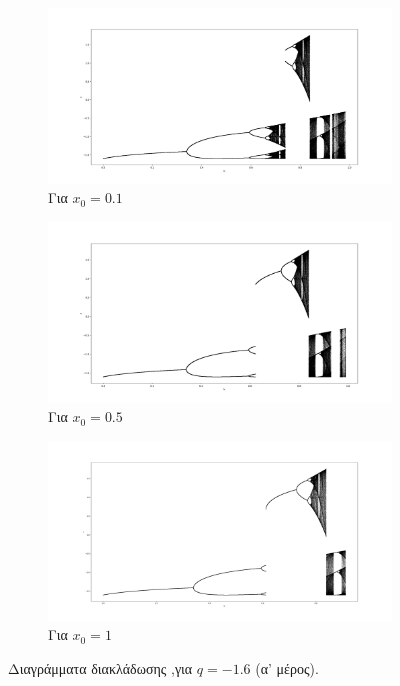 \begin{figure}[ht]
	\centering
	
	\begin{subfigure}[b]{0.8\textwidth}
		\centering
		\includegraphics[width=\textwidth]{LateX images/graphs q16/g1}
		\caption{Για \(x_0=0.1\)}
		\label{f:g27}
	\end{subfigure}
	\hfill
	\begin{subfigure}[b]{0.8\textwidth}
		\centering
		\includegraphics[width=\textwidth]{LateX images/graphs q16/g2}
		\caption{Για \(x_0=0.5\)}
		\label{f:g28}
	\end{subfigure}
	\hfill
	\begin{subfigure}[b]{0.8\textwidth}
		\centering
		\includegraphics[width=\textwidth]{LateX images/graphs q16/g3}
		\caption{Για \(x_0=1\)}
		\label{f:g29}
	\end{subfigure}
	\hfill
	\caption{ Διαγράμματα διακλάδωσης ,για  $q=-1.6$ (α' μέρος).}
	\label{f:g234}
\end{figure}

